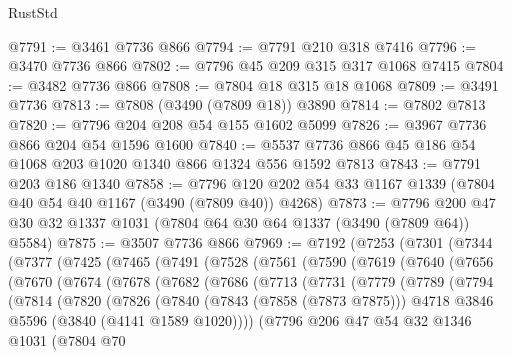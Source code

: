 \begin{lexlean}{RustStd}
\begin{coremodule}
{\begin{coremodule}
{{{{{{{{{{{{{{{{{{{{{{{{{{@7791 := @3461 @7736 @866
@7794 := @7791 @210 @318 @7416
@7796 := @3470 @7736 @866
@7802 := @7796 @45 @209 @315 @317 @1068 @7415
@7804 := @3482 @7736 @866
@7808 := @7804 @18 @315 @18 @1068
@7809 := @3491 @7736
@7813 := @7808 (@3490 (@7809 @18)) @3890
@7814 := @7802 @7813
@7820 := @7796 @204 @208 @54 @155 @1602 @5099
@7826 := @3967 @7736 @866 @204 @54 @1596 @1600
@7840 := @5537 @7736 @866 @45 @186 @54 @1068 @203 @1020 @1340 @866 @1324 @556 @1592 @7813
@7843 := @7791 @203 @186 @1340
@7858 := @7796 @120 @202 @54 @33 @1167 @1339 (@7804 @40 @54 @40 @1167 (@3490 (@7809 @40)) @4268)
@7873 := @7796 @200 @47 @30 @32 @1337 @1031 (@7804 @64 @30 @64 @1337 (@3490 (@7809 @64)) @5584)
@7875 := @3507 @7736 @866
@7969 := @7192
    (@7253
      (@7301
        (@7344
          (@7377
            (@7425
              (@7465
                (@7491
                  (@7528
                    (@7561
                      (@7590
                        (@7619
                          (@7640
                            (@7656
                              (@7670
                                (@7674
                                  (@7678
                                    (@7682
                                      (@7686
                                        (@7713
                                          (@7731
                                            (@7779
                                              (@7789
                                                (@7794
                                                  (@7814
                                                    (@7820
                                                      (@7826
                                                        (@7840
                                                          (@7843 (@7858 (@7873 @7875)))
                                                          @4718
                                                          @3846
                                                          @5596
                                                          (@3840 (@4141 @1589 @1020))))
                                                      (@7796
                                                        @206
                                                        @47
                                                        @54
                                                        @32
                                                        @1346
                                                        @1031
                                                        (@7804
                                                          @70
}}}}}}}}}}}}}}}}}}}}}}}}}}
\end{coremodule}}
\end{coremodule}
\end{lexlean}
